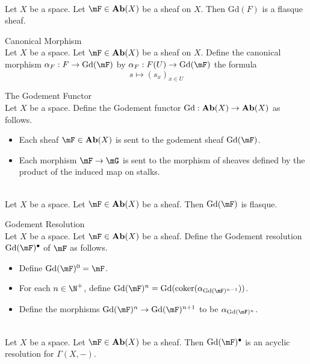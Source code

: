 \documentclass[a4paper]{article}
\begin{document}
\begin{lmm}{}{}\\
Let $X$ be a space. Let $\mF\in\bold{Ab}(X)$ be a sheaf on $X$. Then $\text{Gd}(F)$ is a flasque sheaf. 
\end{lmm}

\begin{defn}{Canonical Morphism}{}\\
Let $X$ be a space. Let $\mF\in\bold{Ab}(X)$ be a sheaf on $X$. Define the canonical morphism $\alpha_F:F\to\text{Gd}(\mF)$ by $\alpha_F:F(U)\to\text{Gd}(\mF)$ the formula $$s\mapsto(s_x)_{x\in U}$$
\end{defn}

\begin{defn}{The Godement Functor}{}\\
Let $X$ be a space. Define the Godement functor $\text{Gd}:\bold{Ab}(X)\to\bold{Ab}(X)$ as follows. 
\begin{itemize}
\item Each sheaf $\mF\in\bold{Ab}(X)$ is sent to the godement sheaf $\text{Gd}(\mF)$. 
\item Each morphism $\mF\to\mG$ is sent to the morphism of sheaves defined by the product of the induced map on stalks. 
\end{itemize}
\end{defn}

\begin{prp}{}{}\\
Let $X$ be a space. Let $\mF\in\bold{Ab}(X)$ be a sheaf. Then $\text{Gd}(\mF)$ is flasque. 
\end{prp}

\begin{defn}{Godement Resolution}{}\\
Let $X$ be a space. Let $\mF\in\bold{Ab}(X)$ be a sheaf. Define the Godement resolution $\text{Gd}(\mF)^\bullet$ of $\mF$ as follows. 
\begin{itemize}
\item Define $\text{Gd}(\mF)^0=\mF$. 
\item For each $n\in\N^+$, define $\text{Gd}(\mF)^n=\text{Gd}(\text{coker}(\alpha_{\text{Gd}(\mF)^{n-1}}))$. 
\item Define the morphisms $\text{Gd}(\mF)^n\to\text{Gd}(\mF)^{n+1}$ to be $\alpha_{\text{Gd}(\mF)^n}$. \end{itemize}
\end{defn}

\begin{crl}{}{}\\
Let $X$ be a space. Let $\mF\in\bold{Ab}(X)$ be a sheaf. Then $\text{Gd}(\mF)^\bullet$ is an acyclic resolution for $\Gamma(X,-)$. 
\end{crl}
\end{document}
